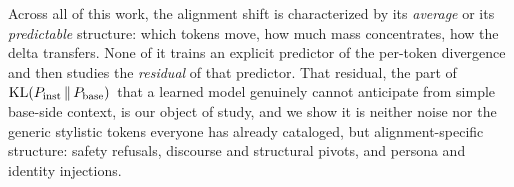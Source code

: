  Across all of this work, the alignment shift is
characterized by its \emph{average} or its \emph{predictable} structure: which
tokens move, how much mass concentrates, how the delta transfers. None of it
trains an explicit predictor of the per-token divergence and then studies the
\emph{residual} of that predictor. That residual, the part of $\mathrm{KL}\!\left(P_{\mathrm{inst}} \,\|\, P_{\mathrm{base}}\right){}$ that a
learned model genuinely cannot anticipate from simple base-side context, is our
object of study, and we show it is neither noise nor the generic stylistic tokens
everyone has already cataloged, but alignment-specific structure: safety
refusals, discourse and structural pivots, and persona and identity injections.
